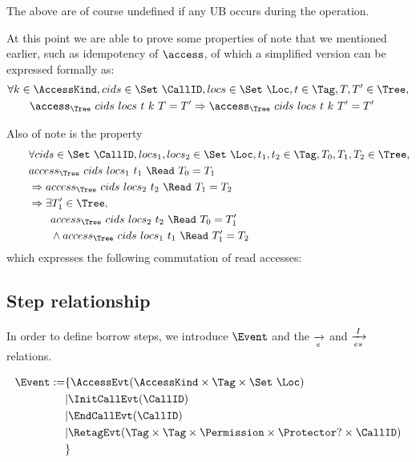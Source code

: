 \documentclass[a4paper,11pt]{article}
\theoremstyle{plain}
\theoremstyle{definition}
\theoremstyle{remark}
\begin{document}
The above are of course undefined if any UB occurs during the operation.

At this point we are able to prove some properties of note that we mentioned earlier,
such as idempotency of \(\access\), of which a simplified version can be expressed formally
as:
\begin{align*}
    &\forall k\in\AccessKind, cids\in\Set~\CallID, locs\in\Set~\Loc, t\in\Tag, T,T'\in\Tree,\\
    &\qquad \access_\Tree~cids~locs~t~k~T = T' \Rightarrow \access_\Tree~cids~locs~t~k~T' = T'
\end{align*}

Also of note is the property
\begin{align*}
    &\forall cids\in\Set~\CallID, locs_1,locs_2\in\Set~\Loc, t_1,t_2\in\Tag, T_0,T_1,T_2\in\Tree,\\
    \qquad &access_\Tree~cids~locs_1~t_1~\Read~T_0 = T_1 \\
           &\Rightarrow access_\Tree~cids~locs_2~t_2~\Read~T_1 = T_2 \\
           &\Rightarrow \exists T'_1\in\Tree, \\
           &\qquad access_\Tree~cids~locs_2~t_2~\Read~T_0 = T'_1 \\
           &\qquad \wedge access_\Tree~cids~locs_1~t_1~\Read~T'_1 = T_2
\end{align*}
which expresses the following commutation of read accesses:

\subsection{Step relationship}

In order to define borrow steps, we introduce \(\Event\) and the \(\xrightarrow[e]{}\) and \(\xrightarrow[es]{I}\) relations.

\begin{align*}
    \Event := &\{ \AccessEvt(\AccessKind\times\Tag\times\Set~\Loc) \\
              &| \InitCallEvt(\CallID) \\
              &| \EndCallEvt(\CallID)\\
              &| \RetagEvt(\Tag\times\Tag\times\Permission\times\Protector?\times\CallID) \\
              &\}
\end{align*}
\end{document}
